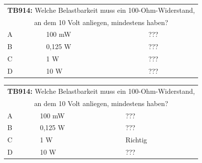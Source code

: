 \begin{frame}
	\begin{small}	
	\begin{tabular}{|l|l|l|}
	\hline
		\multicolumn{3}{|c|}{\textbf{TB914:} Welche Belastbarkeit muss ein 100-Ohm-Widerstand, }\\
		\multicolumn{3}{|c|}{an dem 10 Volt anliegen, mindestens haben?}\\
		\hline
		A & 100 mW & ??? \\ \hline
		B & 0,125 W & ??? \\ \hline
		C & 1 W & ??? \\ \hline
		D & 10 W& ??? \\ \hline 		
	\end{tabular}
	\end{small}
\end{frame}
\begin{frame}
	\begin{small}	
	\begin{tabular}{|l|l|l|}
	\hline
		\multicolumn{3}{|c|}{\textbf{TB914:} Welche Belastbarkeit muss ein 100-Ohm-Widerstand, }\\
		\multicolumn{3}{|c|}{an dem 10 Volt anliegen, mindestens haben?}\\
		\hline
		A & 100 mW & ??? \\ \hline
		B & 0,125 W & ??? \\ \hline
		C & 1 W & Richtig \\ \hline
		D & 10 W& ??? \\ \hline 		
	\end{tabular}
	\end{small}
\end{frame}


